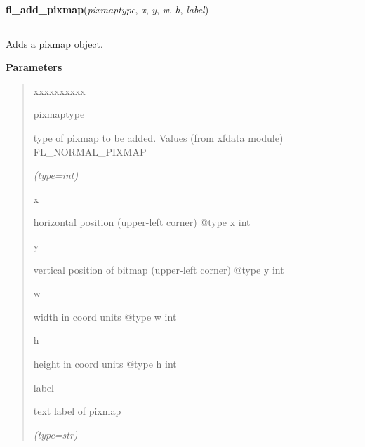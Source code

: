     \label{xformslib:flbitmap:fl_add_pixmap}

    \vspace{0.5ex}

\hspace{.8\funcindent}\begin{boxedminipage}{\funcwidth}

    \raggedright \textbf{fl\_add\_pixmap}(\textit{pixmaptype}, \textit{x}, \textit{y}, \textit{w}, \textit{h}, \textit{label})

    \vspace{-1.5ex}

    \rule{\textwidth}{0.5\fboxrule}
\setlength{\parskip}{2ex}
    Adds a pixmap object.

\setlength{\parskip}{1ex}
      \textbf{Parameters}
      \vspace{-1ex}

      \begin{quote}
        \begin{Ventry}{xxxxxxxxxx}

          \item[pixmaptype]

          type of pixmap to be added. Values (from xfdata module) 
          FL\_NORMAL\_PIXMAP

            {\it (type=int)}

          \item[x]

          horizontal position (upper-left corner) @type x int

          \item[y]

          vertical position of bitmap (upper-left corner) @type y int

          \item[w]

          width in coord units @type w int

          \item[h]

          height in coord units @type h int

          \item[label]

          text label of pixmap

            {\it (type=str)}

        \end{Ventry}


\end{quote}
\end{boxedminipage}
